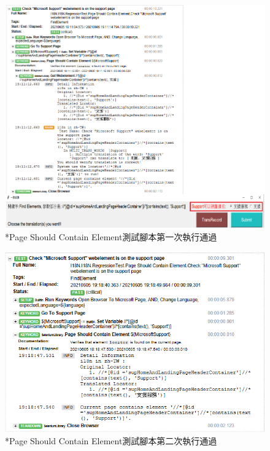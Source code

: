 \begin{figure}[H]
\centering
\includegraphics[width= .9\textwidth]{../論文截圖/4.1.5-2 page should contain element 1st run.png}
\caption{*Page Should Contain Element測試腳本第一次執行通過}
\label{*Page Should Contain Element測試腳本第一次執行通過}
\end{figure}

\begin{figure}[H]
\centering
\includegraphics[width= \textwidth]{../論文截圖/4.1.5-3 page should contain element 2nd run.png}
\caption{*Page Should Contain Element測試腳本第二次執行通過}
\label{*Page Should Contain Element測試腳本第二次執行通過}
\end{figure}

\hspace*{\fill} \\
\\ \hspace*{\fill} \\
\\ \hspace*{\fill} \\
\\ \hspace*{\fill} \\
\\ \hspace*{\fill} \\
